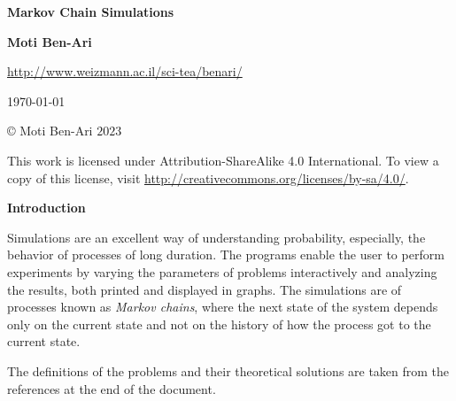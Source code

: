 

\thispagestyle{empty}

\begin{center}
\textbf{\LARGE Markov Chain Simulations}

\bigskip
\bigskip
\bigskip

\textbf{\Large Moti Ben-Ari}

\bigskip

\url{http://www.weizmann.ac.il/sci-tea/benari/}

\bigskip
\bigskip
\bigskip

%

\today

\end{center}

\vfill

\begin{center}
\copyright{} Moti Ben-Ari $2023$
 \end{center}
 
\begin{small}
This work is licensed under Attribution-ShareAlike 4.0 International. To view a copy of this license, visit \url{http://creativecommons.org/licenses/by-sa/4.0/}.
\end{small}
\newpage

\tableofcontents

\newpage

\begin{center}
\textbf{\LARGE Introduction}
\end{center}


\bigskip

Simulations are an excellent way of understanding probability, especially, the behavior of processes of long duration. The programs enable the user to perform experiments by varying the parameters of problems interactively and analyzing the results, both printed and displayed in graphs. The simulations are of processes known as \emph{Markov chains}, where the next state of the system depends only on the current state and not on the history of how the process got to the current state. 

The definitions of the problems and their theoretical solutions are taken from the references at the end of the document.

\nocite{*}

